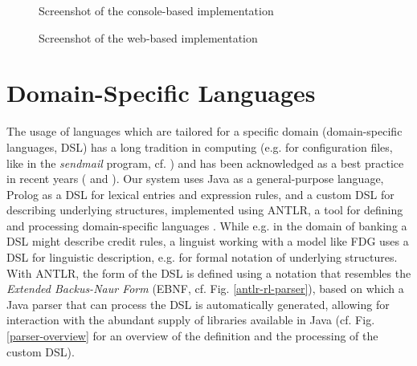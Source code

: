 \documentclass[a4paper, halfparskip, onecolumn, abstractoff, final]{scrartcl}
\begin{document}
\begin{figure}
\begin{center}
\end{center}
\caption{Screenshot of the console-based implementation} \label{console}
\end{figure}

\begin{figure}
\begin{center}
\end{center}
\caption{Screenshot of the web-based implementation} \label{web}
\end{figure}

\section{Domain-Specific Languages}\label{dsls}

The usage of languages which are tailored for a specific domain (domain-specific languages, DSL) has a long tradition in computing (e.g. for configuration files, like in the \emph{sendmail} program, cf. \citealt[Ch. 12]{HuntAndThomas1999}) and has been acknowledged as a best practice in recent years (\citealt[Ch. 12]{HuntAndThomas1999} and \citealt{Parr2007}). Our system uses Java as a general-purpose language, Prolog as a DSL for lexical entries and expression rules, and a custom DSL for describing underlying structures, implemented using ANTLR, a tool for defining and processing domain-specific languages \citep{Parr2007}. While e.g. in the domain of banking a DSL might describe credit rules, a linguist working with a model like FDG uses a DSL for linguistic description, e.g. for formal notation of underlying structures. With ANTLR, the form of the DSL is defined using a notation that resembles the \emph{Extended Backus-Naur Form} (EBNF, cf. Fig. \ref{antlr-rl-parser}), based on which a Java parser that can process the DSL is automatically generated, allowing for interaction with the abundant supply of libraries available in Java (cf. Fig. \ref{parser-overview} for an overview of the definition and the processing of the custom DSL).
\end{document}
